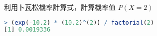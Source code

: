 利用卜瓦松機率計算式，計算機率值 $P(X = 2)$

\begin{lstlisting}[language=R]
> (exp(-10.2) * (10.2)^(2)) / factorial(2)
[1] 0.0019336
\end{lstlisting}
